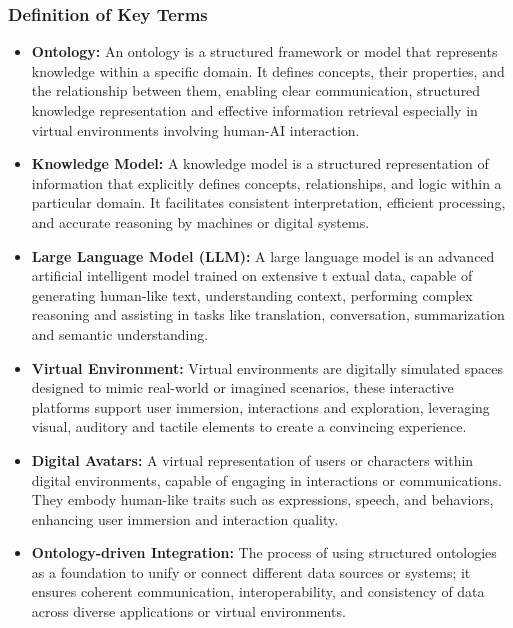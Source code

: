 \documentclass[a4paper,11pt,oneside]{article}
\begin{document}
  \subsubsection{Definition of Key Terms}

  \begin{itemize}
    \item \textbf{Ontology:} An ontology is a structured framework or model that represents knowledge within a specific domain. 
    It defines concepts, their properties, and the relationship between them, enabling clear communication, structured knowledge 
    representation and effective information retrieval especially in virtual environments involving human-AI interaction.
    
    \item \textbf{Knowledge Model:} A knowledge model is a structured representation of information that explicitly defines concepts, 
    relationships, and logic within a particular domain. It facilitates consistent interpretation, efficient processing, and accurate 
    reasoning by machines or digital systems.
    
    \item \textbf{Large Language Model (LLM):} A large language model is an advanced artificial intelligent model trained on extensive t
    extual data, capable of generating human-like text, understanding context, performing complex reasoning and assisting in tasks like 
    translation, conversation, summarization and semantic understanding.
    
    \item \textbf{Virtual Environment:} Virtual environments are digitally simulated spaces designed to mimic real-world or imagined 
    scenarios, these interactive platforms support user immersion, interactions and exploration, leveraging visual, auditory and 
    tactile elements to create a convincing experience.
    
    \item \textbf{Digital Avatars:} A virtual representation of users or characters within digital environments, capable of engaging in 
    interactions or communications. They embody human-like traits such as expressions, speech, and behaviors, enhancing user immersion and interaction quality.
    
    \item \textbf{Ontology-driven Integration:} The process of using structured ontologies as a foundation to unify or connect different 
    data sources or systems; it ensures coherent communication, interoperability, and consistency of data across diverse applications or virtual environments.
    

\end{itemize}
\end{document}
